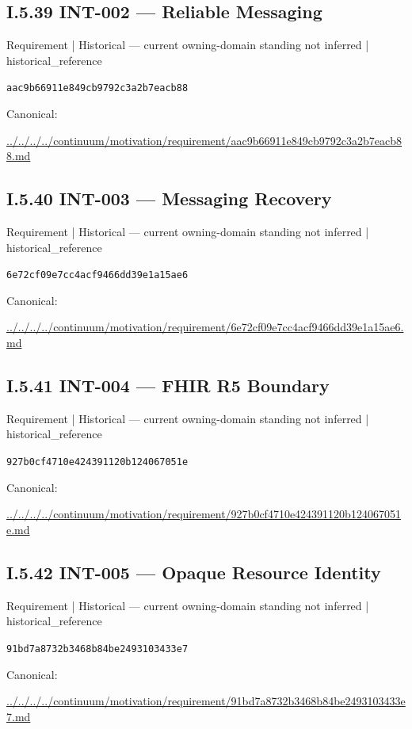 \documentclass[10pt,a4paper]{article}
\begin{document}
\subsection*{I.5.39 INT-002 — Reliable Messaging}
{\small Requirement | Historical — current owning-domain standing not inferred | historical\_reference}\par
\texttt{aac9b66911e849cb9792c3a2b7eacb88}\par
Canonical: \par
{\footnotesize\url{../../../../continuum/motivation/requirement/aac9b66911e849cb9792c3a2b7eacb88.md}}\par
\subsection*{I.5.40 INT-003 — Messaging Recovery}
{\small Requirement | Historical — current owning-domain standing not inferred | historical\_reference}\par
\texttt{6e72cf09e7cc4acf9466dd39e1a15ae6}\par
Canonical: \par
{\footnotesize\url{../../../../continuum/motivation/requirement/6e72cf09e7cc4acf9466dd39e1a15ae6.md}}\par
\subsection*{I.5.41 INT-004 — FHIR R5 Boundary}
{\small Requirement | Historical — current owning-domain standing not inferred | historical\_reference}\par
\texttt{927b0cf4710e424391120b124067051e}\par
Canonical: \par
{\footnotesize\url{../../../../continuum/motivation/requirement/927b0cf4710e424391120b124067051e.md}}\par
\subsection*{I.5.42 INT-005 — Opaque Resource Identity}
{\small Requirement | Historical — current owning-domain standing not inferred | historical\_reference}\par
\texttt{91bd7a8732b3468b84be2493103433e7}\par
Canonical: \par
{\footnotesize\url{../../../../continuum/motivation/requirement/91bd7a8732b3468b84be2493103433e7.md}}\par
\end{document}
